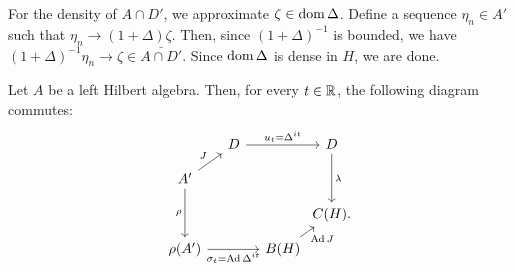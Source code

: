 \documentclass{../../small}
\begin{document}
\begin{pf}
For the density of $A\cap D'$, we approximate $\zeta\in\operatorname{dom}\Delta$.
Define a sequence $\eta_n\in A'$ such that $\eta_n\to(1+\Delta)\zeta$.
Then, since $(1+\Delta)^{-1}$ is bounded, we have $(1+\Delta)^{-1}\eta_n\to\zeta\in\bar{A\cap D'}$.
Since $\operatorname{dom}\Delta$ is dense in $H$, we are done.
\end{pf}


\begin{thm}
Let $A$ be a left Hilbert algebra.
Then, for every $t\in\mathbb{R}$, the following diagram commutes:
\[\begin{tikzcd}[column sep={3.5em,between origins},row sep={2.5em,between origins}]
&D\ar{rr}{u_t=\Delta^{it}}&&D\ar{dd}{\lambda}\\
A'\ar{ur}{J}\ar[swap]{dd}{\rho}&&&\\
&&&C(H).\\
\rho(A')\ar[swap]{rr}{\sigma_t=\Ad\Delta^{it}}&&B(H)\ar[swap]{ur}{\Ad J}&
\end{tikzcd}\]
\end{thm}
\end{document}
